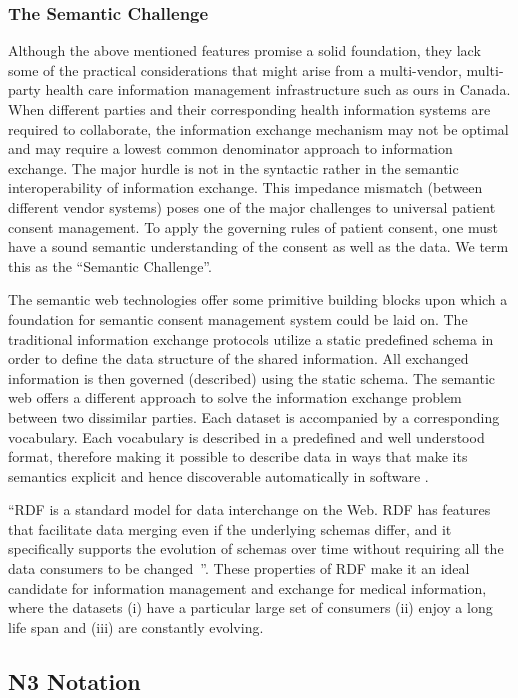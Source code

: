 \documentclass[conference]{IEEEtran}
\begin{document}
\subsubsection*{The Semantic Challenge}
Although the above mentioned features promise a solid foundation, they lack some of the practical considerations that might arise from a multi-vendor,
multi-party health care information management infrastructure such as ours in Canada.  When different parties and their corresponding health information systems
are required to collaborate, the information exchange mechanism may not be optimal and may require a lowest common denominator approach to information exchange.
 The major hurdle is not in the syntactic rather in the semantic interoperability of information exchange.  This impedance mismatch (between different vendor
systems) poses one of the major challenges to universal patient consent management. To apply the governing rules of patient consent, one must have a sound
semantic understanding of the consent as well as the data.  We term this as the “Semantic Challenge”.  

The semantic web technologies offer some primitive building blocks upon which a foundation for semantic consent management system could be laid on.  The
traditional information exchange protocols utilize a static predefined schema in order to define the data structure of the shared information. All exchanged
information is then governed (described) using the static schema.  The semantic web offers a different approach to solve the information exchange problem
between two dissimilar parties.  Each dataset is accompanied by a corresponding vocabulary.  Each vocabulary is described in a predefined and well understood
format, therefore making it possible to describe data in ways that make its semantics explicit and hence discoverable automatically in software .

“RDF is a standard model for data interchange on the Web. RDF has features that facilitate data merging even if the underlying schemas differ, and it
specifically supports the evolution of schemas over time without requiring all the data consumers to be changed~\cite{rdfsite}”.  These properties of RDF make
it an ideal candidate for information management and exchange for medical information, where the datasets (i) have a particular large set of consumers (ii)
enjoy a long life span and (iii) are constantly evolving.

\subsection{N3 Notation}
\end{document}
